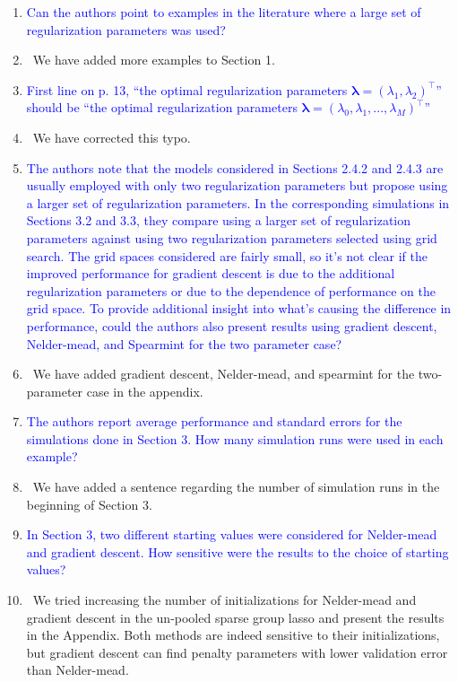 \documentclass[]{article}
\newcommand{\point}[1]{\item \textcolor{blue}{#1}}
\newcommand{\reply}{\item[]\ }
\begin{document}
	\begin{enumerate}
		\point{Can the authors point to examples in the literature where a large set of regularization parameters was used?}
		
		\reply We have added more examples to Section 1.
		
		\point{First line on p. 13, ``the optimal regularization parameters $\boldsymbol{\lambda} = (\lambda_1,\lambda_2)^\top$'' should be ``the optimal regularization parameters $\boldsymbol{\lambda} = (\lambda_0, \lambda_1, ... , \lambda_M)^\top$''}
		
		\reply We have corrected this typo.
		
		\point{The authors note that the models considered in Sections 2.4.2 and 2.4.3 are usually employed with only two regularization parameters but propose using a larger set of regularization parameters. In the corresponding simulations in Sections 3.2 and 3.3, they compare using a larger set of regularization parameters against using two regularization parameters selected using grid search. The grid spaces considered are fairly small, so it’s not clear if the improved performance for gradient descent is due to the additional regularization parameters or due to the dependence of performance on the grid space. To provide additional insight into what’s causing the difference in performance, could the authors also present results using gradient descent, Nelder-mead, and Spearmint for the two parameter case?}
		
		\reply We have added gradient descent, Nelder-mead, and spearmint for the two-parameter case in the appendix.
		
		\point{The authors report average performance and standard errors for the simulations done in Section 3. How many simulation runs were used in each example?}
		
		\reply We have added a sentence regarding the number of simulation runs in the beginning of Section 3.
		
		\point{In Section 3, two different starting values were considered for Nelder-mead and gradient descent. How sensitive were the results to the choice of starting values?}
		
		\reply We tried increasing the number of initializations for Nelder-mead and gradient descent in the un-pooled sparse group lasso and present the results in the Appendix. Both methods are indeed sensitive to their initializations, but gradient descent can find penalty parameters with lower validation error than Nelder-mead.
		

\end{enumerate}
\end{document}

